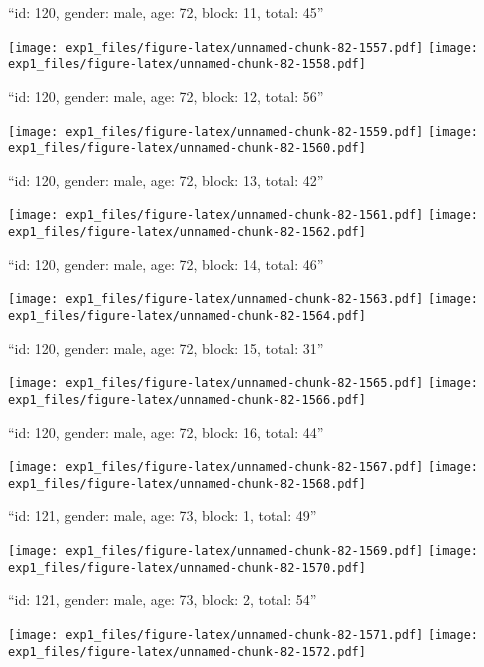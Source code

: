 \documentclass[11pt,,]{article}
\begin{document}
\newpage
[1] 

``id: 120, gender: male, age: 72, block: 11, total: 45''

\texttt{[image: exp1\_files/figure-latex/unnamed-chunk-82-1557.pdf]}
\texttt{[image: exp1\_files/figure-latex/unnamed-chunk-82-1558.pdf]}

\newpage
[1] 

``id: 120, gender: male, age: 72, block: 12, total: 56''

\texttt{[image: exp1\_files/figure-latex/unnamed-chunk-82-1559.pdf]}
\texttt{[image: exp1\_files/figure-latex/unnamed-chunk-82-1560.pdf]}

\newpage
[1] 

``id: 120, gender: male, age: 72, block: 13, total: 42''

\texttt{[image: exp1\_files/figure-latex/unnamed-chunk-82-1561.pdf]}
\texttt{[image: exp1\_files/figure-latex/unnamed-chunk-82-1562.pdf]}

\newpage
[1] 

``id: 120, gender: male, age: 72, block: 14, total: 46''

\texttt{[image: exp1\_files/figure-latex/unnamed-chunk-82-1563.pdf]}
\texttt{[image: exp1\_files/figure-latex/unnamed-chunk-82-1564.pdf]}

\newpage
[1] 

``id: 120, gender: male, age: 72, block: 15, total: 31''

\texttt{[image: exp1\_files/figure-latex/unnamed-chunk-82-1565.pdf]}
\texttt{[image: exp1\_files/figure-latex/unnamed-chunk-82-1566.pdf]}

\newpage
[1] 

``id: 120, gender: male, age: 72, block: 16, total: 44''

\texttt{[image: exp1\_files/figure-latex/unnamed-chunk-82-1567.pdf]}
\texttt{[image: exp1\_files/figure-latex/unnamed-chunk-82-1568.pdf]}

\newpage
[1] 

``id: 121, gender: male, age: 73, block: 1, total: 49''

\texttt{[image: exp1\_files/figure-latex/unnamed-chunk-82-1569.pdf]}
\texttt{[image: exp1\_files/figure-latex/unnamed-chunk-82-1570.pdf]}

\newpage
[1] 

``id: 121, gender: male, age: 73, block: 2, total: 54''

\texttt{[image: exp1\_files/figure-latex/unnamed-chunk-82-1571.pdf]}
\texttt{[image: exp1\_files/figure-latex/unnamed-chunk-82-1572.pdf]}
\end{document}
